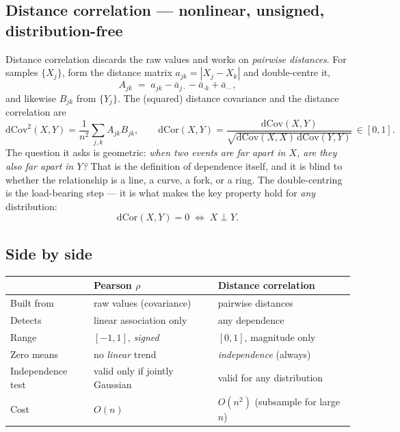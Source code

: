\documentclass[11pt]{article}
\newcommand{\dcor}{\mathrm{dCor}}
\newcommand{\dcov}{\mathrm{dCov}}
\begin{document}
\subsection*{Distance correlation --- nonlinear, unsigned, distribution-free}
Distance correlation discards the raw values and works on \emph{pairwise
distances}. For samples $\{X_j\}$, form the distance matrix $a_{jk}=|X_j-X_k|$
and double-centre it,
\begin{equation}
A_{jk} \;=\; a_{jk} - \bar a_{j\cdot} - \bar a_{\cdot k} + \bar a_{\cdot\cdot},
\end{equation}
and likewise $B_{jk}$ from $\{Y_j\}$. The (squared) distance covariance and the
distance correlation are
\begin{equation}
\dcov^2(X,Y) = \frac{1}{n^2}\sum_{j,k} A_{jk}B_{jk},
\qquad
\dcor(X,Y) = \frac{\dcov(X,Y)}{\sqrt{\dcov(X,X)\,\dcov(Y,Y)}}\,\in[0,1].
\end{equation}
The question it asks is geometric: \emph{when two events are far apart in $X$,
are they also far apart in $Y$?} That is the definition of dependence itself,
and it is blind to whether the relationship is a line, a curve, a fork, or a
ring. The double-centring is the load-bearing step --- it is what makes the
key property hold for \emph{any} distribution:
\begin{equation}
\dcor(X,Y) = 0 \;\Longleftrightarrow\; X \perp Y .
\end{equation}

\subsection*{Side by side}
\begin{center}
\renewcommand{\arraystretch}{1.25}
\begin{tabular}{@{}lll@{}}
\toprule
& \textbf{Pearson $\rho$} & \textbf{Distance correlation} \\
\midrule
Built from        & raw values (covariance)        & pairwise distances \\
Detects           & linear association only        & any dependence \\
Range             & $[-1,1]$, \emph{signed}        & $[0,1]$, magnitude only \\
Zero means        & no \emph{linear} trend         & \emph{independence} (always) \\
Independence test & valid only if jointly Gaussian & valid for any distribution \\
Cost              & $O(n)$                         & $O(n^2)$ (subsample for large $n$) \\
\bottomrule
\end{tabular}
\end{center}
\end{document}
